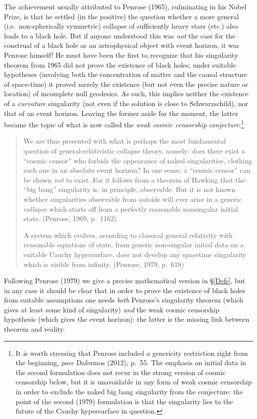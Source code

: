 \documentclass[12pt]{article}
\begin{document}
The achievement  usually attributed to Penrose (1965), culminating in his Nobel Prize, is that he 
settled (in the positive) the question whether a more general (i.e.\ non-spherically symmetric) collapse of sufficiently heavy stars (etc.) also leads to a black hole. But
if anyone understood this was \emph{not} the case for the construal of a black hole as an astrophysical object with event horizon,
  it was Penrose himself! He must have been the first to recognize that his singularity theorem from 1965 did not prove the existence of black holes; under suitable hypotheses (involving both the concentration of matter and the causal structure of space-time) it  proved merely the existence (but not even the precise nature or location) of incomplete null geodesics. As such, this implies neither the existence of a \emph{curvature} singularity (not even if the solution is close to Schwarzschild), nor that of an event horizon. 
   Leaving the former aside for the moment, the latter became the topic of what is now called  the  \emph{weak cosmic censorship conjecture}:\footnote{\label{PD} It is worth stressing that Penrose included a genericity restriction right from the beginning, \emph{pace}  Dafermos (2012), p.\ 55.
 The emphasis on initial data in the second formulation does not recur in the strong version of cosmic censorship below, but it is unavoidable in any form of weak cosmic censorship in order to exclude the naked big bang singularity from the conjecture: the point of the second (1979) formulation is that the singularity lies to the future of the Cauchy hypersurface in question. 
    }
  \begin{quote}
\begin{small}
We are thus presented with what is perhaps the most fundamental question of general-relativistic collapse theory, namely: does there exist a ``cosmic censor'' who forbids the appearance of naked singularities, clothing each one in an absolute event horizon? In one sense, a  ``cosmic censor'' can be shown \emph{not} to exist. For it follows from a theorem of Hawking that the ``big bang'' singularity is, in principle, observable. But it is not known whether singularities observable from outside will ever arise in a generic \emph{collapse} which starts off from a perfectly reasonable nonsingular initial state.  (Penrose, 1969,  p.\ 1162)

A system which evolves, according to classical general relativity with reasonable equations of state, from generic non-singular  initial data on a suitable Cauchy hypersurface, does not develop any spacetime singularity which is visible 
from infinity. (Penrose, 1979, p.\ 618)
\end{small}
\end{quote}
Following Penrose (1979) we give a precise mathematical version in \S\ref{Defs}, but in any case it should be clear that in order to prove the existence of black holes from suitable assumptions one needs \emph{both} Penrose's singularity theorem (which gives at least some kind of singularity) \emph{and} the weak cosmic censorship hypothesis (which gives the event horizon): the latter is the missing link between theorem and reality. 
\end{document}
